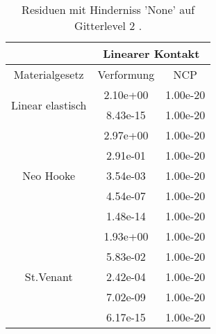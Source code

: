 \begin{table} 
\centering 
\begin{tabular}{c|cc|} 
\cline{2-3} 
 & \multicolumn{2}{|c|}{Linearer Kontakt} \\ 
\hline 
\multicolumn{1}{|c|}{Materialgesetz} & \multicolumn{1}{c|}{Verformung} & \multicolumn{1}{c|}{NCP} \\ 
\hline 
\multicolumn{1}{|c|}{\multirow{2}{*}{Linear elastisch}} &\multicolumn{1}{|c|}{  2.10e+00} & \multicolumn{1}{|c|}{  1.00e-20} \\ 
\multicolumn{1}{|c|}{} & \multicolumn{1}{|c|}{  8.43e-15} & \multicolumn{1}{|c|}{  1.00e-20} \\ 
\hline 
\multicolumn{1}{|c|}{\multirow{5}{*}{Neo Hooke}} &\multicolumn{1}{|c|}{  2.97e+00} & \multicolumn{1}{|c|}{  1.00e-20} \\ 
\multicolumn{1}{|c|}{} & \multicolumn{1}{|c|}{  2.91e-01} & \multicolumn{1}{|c|}{  1.00e-20} \\ 
\multicolumn{1}{|c|}{} & \multicolumn{1}{|c|}{  3.54e-03} & \multicolumn{1}{|c|}{  1.00e-20} \\ 
\multicolumn{1}{|c|}{} & \multicolumn{1}{|c|}{  4.54e-07} & \multicolumn{1}{|c|}{  1.00e-20} \\ 
\multicolumn{1}{|c|}{} & \multicolumn{1}{|c|}{  1.48e-14} & \multicolumn{1}{|c|}{  1.00e-20} \\ 
\hline 
\multicolumn{1}{|c|}{\multirow{5}{*}{St.Venant}} &\multicolumn{1}{|c|}{  1.93e+00} & \multicolumn{1}{|c|}{  1.00e-20} \\ 
\multicolumn{1}{|c|}{} & \multicolumn{1}{|c|}{  5.83e-02} & \multicolumn{1}{|c|}{  1.00e-20} \\ 
\multicolumn{1}{|c|}{} & \multicolumn{1}{|c|}{  2.42e-04} & \multicolumn{1}{|c|}{  1.00e-20} \\ 
\multicolumn{1}{|c|}{} & \multicolumn{1}{|c|}{  7.02e-09} & \multicolumn{1}{|c|}{  1.00e-20} \\ 
\multicolumn{1}{|c|}{} & \multicolumn{1}{|c|}{  6.17e-15} & \multicolumn{1}{|c|}{  1.00e-20} \\ 
\hline 
\end{tabular}\caption{Residuen mit Hinderniss 'None' auf Gitterlevel 2 .}\label{tab:Residuum_None_level2}
\end{table} 
